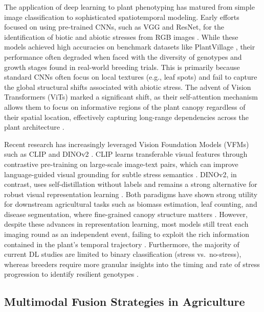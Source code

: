 \documentclass[a4paper,fleqn]{cas-dc}
\begin{document}
The application of deep learning to plant phenotyping has matured from simple image classification to sophisticated spatiotemporal modeling. Early efforts focused on using pre-trained CNNs, such as VGG and ResNet, for the identification of biotic and abiotic stresses from RGB images \citep{singhDeepLearningPlant2018, ubbensDeepLearningPlant2025}. While these models achieved high accuracies on benchmark datasets like PlantVillage \citep{mohantyUsingDeepLearning2016}, their performance often degraded when faced with the diversity of genotypes and growth stages found in real-world breeding trials. This is primarily because standard CNNs often focus on local textures (e.g., leaf spots) and fail to capture the global structural shifts associated with abiotic stress. The advent of Vision Transformers (ViTs) marked a significant shift, as their self-attention mechanism allows them to focus on informative regions of the plant canopy regardless of their spatial location, effectively capturing long-range dependencies across the plant architecture \citep{dhruwDevelopmentUnifiedDeep2025}.

Recent research has increasingly leveraged Vision Foundation Models (VFMs) such as CLIP and DINOv2 \citep{oquabDINOv2LearningRobust2024}. CLIP learns transferable visual features through contrastive pre-training on large-scale image-text pairs, which can improve language-guided visual grounding for subtle stress semantics \citep{guBioCLIP2Emergent2025}. DINOv2, in contrast, uses self-distillation without labels and remains a strong alternative for robust visual representation learning \citep{oquabDINOv2LearningRobust2024}. Both paradigms have shown strong utility for downstream agricultural tasks such as biomass estimation, leaf counting, and disease segmentation, where fine-grained canopy structure matters \citep{chenAdaptingVisionFoundation2023}. However, despite these advances in representation learning, most models still treat each imaging round as an independent event, failing to exploit the rich information contained in the plant's temporal trajectory \citep{changTimeSeriesGrowthPrediction2021}. Furthermore, the majority of current DL studies are limited to binary classification (stress vs.\ no-stress), whereas breeders require more granular insights into the timing and rate of stress progression to identify resilient genotypes \citep{harfoucheAcceleratingClimateResilient2019}.

\subsection{Multimodal Fusion Strategies in Agriculture}\label{sec:related:fusion}
\end{document}
